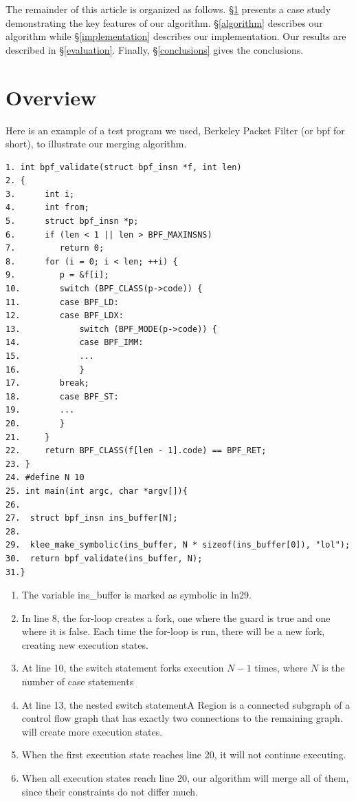 \documentclass[12pt,a4paper]{article}
\begin{document}
The remainder of this article is organized as follows. \S\ref{overview} presents a case study demonstrating the key features of our algorithm. \S\ref{algorithm} describes our algorithm while \S\ref{implementation} describes our implementation. Our results are described in \S\ref{evaluation}. Finally, \S\ref{conclusions} gives the conclusions.

\section{Overview}\label{overview}
Here is an example of a test program we used, Berkeley Packet Filter (or bpf for short), to illustrate our merging algorithm.

\begin{verbatim}
1. int bpf_validate(struct bpf_insn *f, int len)
2. {
3.      int i;
4.      int from;
5.      struct bpf_insn *p;
6.      if (len < 1 || len > BPF_MAXINSNS)
7.         return 0;
8.      for (i = 0; i < len; ++i) {
9.         p = &f[i];
10.        switch (BPF_CLASS(p->code)) {
11.        case BPF_LD:
12.        case BPF_LDX:
13.            switch (BPF_MODE(p->code)) {
14.            case BPF_IMM:
15.            ...
16.            }
17.        break;
18.        case BPF_ST:
19.        ...
20.        }
21.     }
22.     return BPF_CLASS(f[len - 1].code) == BPF_RET;
23. }
24. #define N 10 
25. int main(int argc, char *argv[]){  
26.
27.  struct bpf_insn ins_buffer[N];
28.
29.  klee_make_symbolic(ins_buffer, N * sizeof(ins_buffer[0]), "lol");
30.  return bpf_validate(ins_buffer, N);
31.}
\end{verbatim}

\begin{enumerate}
\item The variable ins\_buffer is marked as symbolic in ln29. 
\item In line 8, the for-loop creates a fork, one where the guard is true and one where it is false. Each time the for-loop is run, there will be a new fork, creating new execution states. 
\item At line 10, the switch statement forks execution $N-1$ times, where $N$ is the number of case statements
\item At line 13, the nested switch statementA Region is a connected subgraph of a control flow graph that has exactly two connections to the remaining graph. will create more execution states. 
\item When the first execution state reaches line 20, it will not continue executing.
\item When all execution states reach line 20, our algorithm will merge all of them, since their constraints do not differ much.
\end{enumerate}
\end{document}
